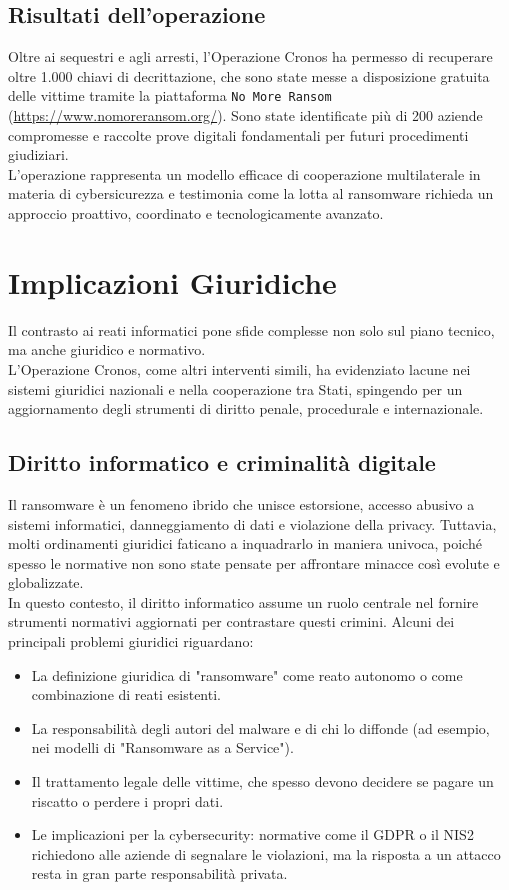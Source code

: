 \documentclass[a4paper,12pt]{article}
\begin{document}
\subsection{Risultati dell'operazione}
Oltre ai sequestri e agli arresti, l'Operazione Cronos ha permesso di recuperare oltre 1.000 chiavi di decrittazione, che sono state messe a disposizione gratuita delle vittime tramite la piattaforma \texttt{No More Ransom} (\url{https://www.nomoreransom.org/}). Sono state identificate più di 200 aziende compromesse e raccolte prove digitali fondamentali per futuri procedimenti giudiziari.\\
L'operazione rappresenta un modello efficace di cooperazione multilaterale in materia di cybersicurezza e testimonia come la lotta al ransomware richieda un approccio proattivo, coordinato e tecnologicamente avanzato.

\section{Implicazioni Giuridiche}
Il contrasto ai reati informatici pone sfide complesse non solo sul piano tecnico, ma anche giuridico e normativo.\\
L'Operazione Cronos, come altri interventi simili, ha evidenziato lacune nei sistemi giuridici nazionali e nella cooperazione tra Stati, spingendo per un aggiornamento degli strumenti di diritto penale, procedurale e internazionale.

\subsection{Diritto informatico e criminalità digitale}
Il ransomware è un fenomeno ibrido che unisce estorsione, accesso abusivo a sistemi informatici, danneggiamento di dati e violazione della privacy. Tuttavia, molti ordinamenti giuridici faticano a inquadrarlo in maniera univoca, poiché spesso le normative non sono state pensate per affrontare minacce così evolute e globalizzate.\\
In questo contesto, il diritto informatico assume un ruolo centrale nel fornire strumenti normativi aggiornati per contrastare questi crimini. Alcuni dei principali problemi giuridici riguardano:

\begin{itemize}
    \item La definizione giuridica di "ransomware" come reato autonomo o come combinazione di reati esistenti.
    \item La responsabilità degli autori del malware e di chi lo diffonde (ad esempio, nei modelli di "Ransomware as a Service").
    \item Il trattamento legale delle vittime, che spesso devono decidere se pagare un riscatto o perdere i propri dati.
    \item Le implicazioni per la cybersecurity: normative come il GDPR o il NIS2 richiedono alle aziende di segnalare le violazioni, ma la risposta a un attacco resta in gran parte responsabilità privata.
\end{itemize}
\end{document}
